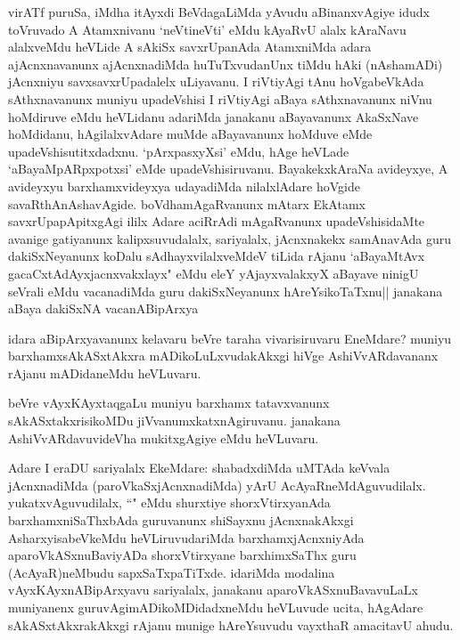 \begin{artha}
virATf puruSa, iMdha itAyxdi BeVdagaLiMda yAvudu aBinanxvAgiye idudx toVruvado A Atamxnivanu `neVtineVti' eMdu kAyaRvU alalx kAraNavu alalxveMdu heVLide A sAkiSx savxrUpanAda AtamxniMda adara ajAcnxnavanunx ajAcnxnadiMda huTuTxvudanUnx tiMdu hAki (nAshamADi) jAcnxniyu savxsavxrUpadalelx uLiyavanu. I riVtiyAgi tAnu hoVgabeVkAda sAthxnavanunx muniyu upadeVshisi I riVtiyAgi aBaya sAthxnavanunx niVnu hoMdiruve eMdu heVLidanu adariMda janakanu aBayavanunx AkaSxNave hoMdidanu, hAgilalxvAdare muMde aBayavanunx hoMduve eMde upadeVshisutitxdadxnu. `pArxpasxyXsi' eMdu, hAge heVLade `aBayaMpARpxpotx\s si' eMde upadeVshisiruvanu. BayakekxkAraNa avideyxye, A avideyxyu barxhamxvideyxya udayadiMda nilalxlAdare hoVgide savaRthAnAshavAgide. boVdhamAgaRvanunx mAtarx EkAtamx savxrUpapApitxgAgi ililx Adare aciRrAdi mAgaRvanunx upadeVshisidaMte avanige gatiyanunx kalipxsuvudalalx, sariyalalx, jAcnxnakekx samAnavAda guru dakiSxNeyanunx koDalu sAdhayxvilalxveMdeV tiLida rAjanu `aBayaMtAvx gacaCxtAdAyxjacnxvakxlayx" eMdu eleY yAjayxvalakxyX aBayave ninigU seVrali eMdu vacanadiMda guru dakiSxNeyanunx hAreYsikoTaTxnu|| janakana aBaya dakiSxNA vacanABipArxya
\end{artha}


\begin{artha}
idara aBipArxyavanunx kelavaru beVre taraha vivarisiruvaru EneMdare? muniyu barxhamxsAkASxtAkxra mADikoLuLxvudakAkxgi hiVge AshiVvARdavananx rAjanu mADidaneMdu heVLuvaru.
\end{artha}

\begin{artha}
beVre vAyxKAyxtaqgaLu muniyu barxhamx tatavxvanunx sAkASxtakxrisikoMDu jiVvanumxkatxnAgiruvanu. janakana AshiVvARdavuvideVha mukitxgAgiye eMdu heVLuvaru.
\end{artha}

\begin{artha}
Adare I eraDU sariyalalx EkeMdare: shabadxdiMda uMTAda keVvala jAcnxnadiMda (paroVkaSxjAcnxnadiMda) yArU AcAyaRneMdAguvudilalx. yukatxvAguvudilalx, ``\stext " eMdu shurxtiye shorxVtirxyanAda barxhamxniSaThxbAda guruvanunx shiSayxnu jAcnxnakAkxgi AsharxyisabeVkeMdu heVLiruvudariMda barxhamxjAcnxniyAda aparoVkASxnuBaviyADa shorxVtirxyane barxhimxSaThx guru (AcAyaR)neMbudu sapxSaTxpaTiTxde. idariMda modalina vAyxKAyxnABipArxyavu sariyalalx, janakanu aparoVkASxnuBavavuLaLx muniyanenx guruvAgimADikoMDidadxneMdu heVLuvude ucita, hAgAdare sAkASxtAkxrakAkxgi rAjanu munige hAreYsuvudu vayxthaR amacitavU ahudu. 
\end{artha}

